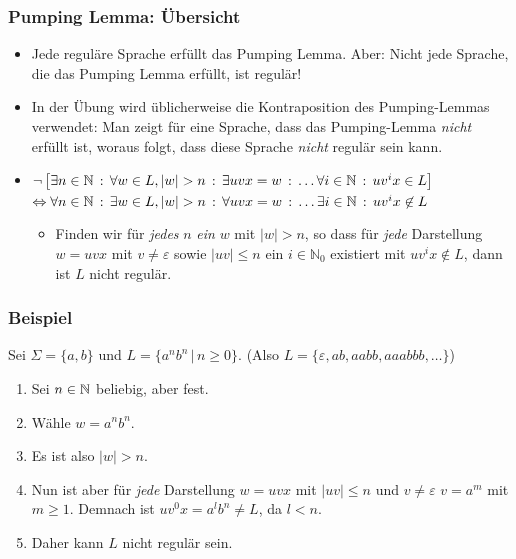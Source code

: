 \begin{frame}
\frametitle{Pumping Lemma: Übersicht}
\begin{itemize}
\item Jede reguläre Sprache erfüllt das Pumping Lemma. Aber: Nicht jede Sprache, die das Pumping Lemma erfüllt, ist regulär!
\item In der Übung wird üblicherweise die Kontraposition des Pumping-Lemmas verwendet: Man zeigt für eine Sprache, dass das Pumping-Lemma \emph{nicht} erfüllt ist, woraus folgt, dass diese Sprache \emph{nicht} regulär sein kann.

\pause\item $ \neg\left[ \exists n \in \mathbb{N} \,:\, \forall w \in L, |w| > n \,:\, \exists uvx=w \,:\, \ldots \forall i \in \mathbb{N} \,:\, uv^i x \in L\right] $ \\ $ \Leftrightarrow \forall n \in \mathbb{N} \,:\, \exists w \in L, |w| > n \,:\, \forall uvx=w \,:\, \ldots \exists i \in \mathbb{N} \,:\, uv^i x \not\in L $

\pause\begin{itemize}
\item Finden wir für \emph{jedes} $n$ \emph{ein} $w$ mit $\left|w\right| > n$, so dass für \emph{jede} Darstellung $w = uvx$ mit $v \neq \varepsilon$ sowie $\left|uv\right| \leq n$ ein $i \in \mathbb{N}_0$ existiert mit $uv^ix \notin L$, dann ist $L$ nicht regulär.
\end{itemize}
\end{itemize}

\end{frame}

\begin{frame}
\frametitle{Beispiel}
Sei $\Sigma = \{a, b\}$ und $L = \{a^nb^n\,|\,n\geq0\}$. (Also $L = \{\varepsilon,ab, aabb, aaabbb, \ldots\}$)
\begin{enumerate}[<+->]
\item Sei $n \in \mathbb{N}$ beliebig, aber fest.
\item Wähle $w = a^nb^n$.
\item Es ist also $\left|w\right| > n$.
\item Nun ist aber für \emph{jede} Darstellung $w = uvx$ mit $\left|uv\right| \leq n$ und $v \neq \varepsilon$ $v = a^m$ mit $m \geq 1$. Demnach ist $uv^0x = a^lb^n \neq L$, da $l < n$.
\item Daher kann $L$ nicht regulär sein.
\end{enumerate}

\end{frame}

